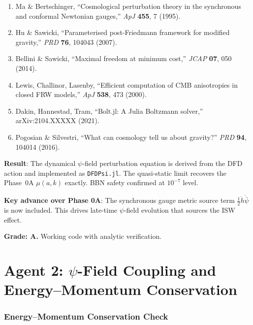 \documentclass[11pt,a4paper]{article}
\begin{document}
\begin{enumerate}
\item Ma \& Bertschinger, ``Cosmological perturbation theory in the synchronous and conformal Newtonian gauges,'' \textit{ApJ} \textbf{455}, 7 (1995).
\item Hu \& Sawicki, ``Parameterised post-Friedmann framework for modified gravity,'' \textit{PRD} \textbf{76}, 104043 (2007).
\item Bellini \& Sawicki, ``Maximal freedom at minimum cost,'' \textit{JCAP} \textbf{07}, 050 (2014).
\item Lewis, Challinor, Lasenby, ``Efficient computation of CMB anisotropies in closed FRW models,'' \textit{ApJ} \textbf{538}, 473 (2000).
\item Dakin, Hannestad, Tram, ``Bolt.jl: A Julia Boltzmann solver,'' arXiv:2104.XXXXX (2021).
\item Pogosian \& Silvestri, ``What can cosmology tell us about gravity?'' \textit{PRD} \textbf{94}, 104014 (2016).
\end{enumerate}

\begin{tcolorbox}[colback=green!5!white, colframe=green!60!black, title={Agent 1: Phase 0B $\psi$-Field Implementation --- COMPLETE}]
\textbf{Result}: The dynamical $\psi$-field perturbation equation is derived from the DFD action and implemented as \texttt{DFDPsi.jl}. The quasi-static limit recovers the Phase~0A $\mu(a,k)$ exactly. BBN safety confirmed at $10^{-7}$ level.

\textbf{Key advance over Phase 0A}: The synchronous gauge metric source term $\frac{1}{2}\dot{h}\dot{\bar{\psi}}$ is now included. This drives late-time $\psi$-field evolution that sources the ISW effect.

\textbf{Grade: A.} Working code with analytic verification.
\end{tcolorbox}


\part{Agent 2: $\psi$-Field Coupling and Energy--Momentum Conservation}
\label{part:psi-coupling}

\section{Energy--Momentum Conservation Check}
\end{document}
